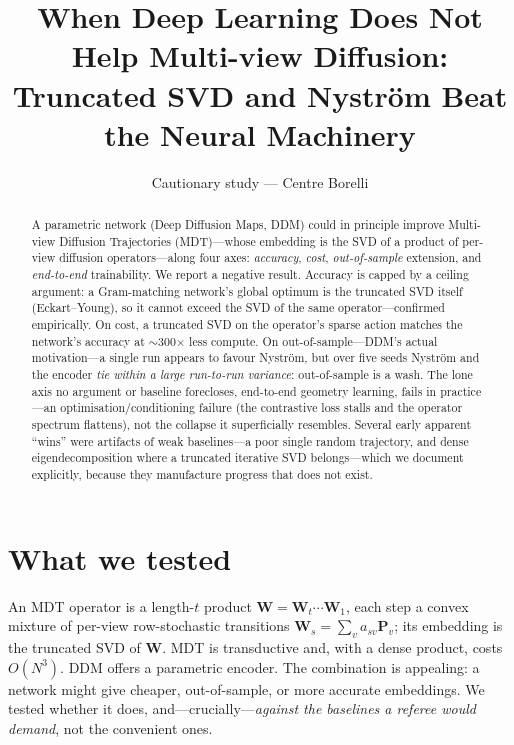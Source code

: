 \documentclass[10pt,twocolumn]{article}
\title{\vspace{-1.4em}\textbf{When Deep Learning Does Not Help Multi-view Diffusion:\\
Truncated SVD and Nystr\"om Beat the Neural Machinery}}
\author{\normalsize Cautionary study --- Centre Borelli}
\date{}
\newcommand{\W}{\mathbf{W}}
\begin{document}
\maketitle

\begin{abstract}
\noindent
A parametric network (Deep Diffusion Maps, DDM) could in principle improve Multi-view Diffusion
Trajectories (MDT)---whose embedding is the SVD of a product of per-view diffusion operators---along
four axes: \emph{accuracy}, \emph{cost}, \emph{out-of-sample} extension, and \emph{end-to-end}
trainability. We report a negative result. Accuracy is capped by a ceiling argument: a Gram-matching
network's global optimum is the truncated SVD itself (Eckart--Young), so it cannot exceed the SVD of
the same operator---confirmed empirically. On cost, a truncated SVD on the operator's sparse action
matches the network's accuracy at $\sim$300$\times$ less compute. On out-of-sample---DDM's actual
motivation---a single run appears to favour Nystr\"om, but over five seeds Nystr\"om and the encoder
\emph{tie within a large run-to-run variance}: out-of-sample is a wash. The lone axis no argument or
baseline forecloses, end-to-end geometry learning, fails in practice---an optimisation/conditioning
failure (the contrastive loss stalls and the operator spectrum flattens), not the collapse it
superficially resembles. Several
early apparent ``wins'' were artifacts of weak baselines---a poor single random trajectory, and dense
eigendecomposition where a truncated iterative SVD belongs---which we document explicitly, because
they manufacture progress that does not exist.
\end{abstract}

\section{What we tested}
An MDT operator is a length-$t$ product $\W=\W_t\cdots\W_1$, each step a convex mixture of per-view
row-stochastic transitions $\W_s=\sum_v a_{sv}\mathbf{P}_v$; its embedding is the truncated SVD of
$\W$. MDT is transductive and, with a dense product, costs $O(N^3)$. DDM offers a parametric
encoder. The combination is appealing: a network might give cheaper, out-of-sample, or more accurate
embeddings. We tested whether it does, and---crucially---\emph{against the baselines a referee would
demand}, not the convenient ones.
\end{document}
